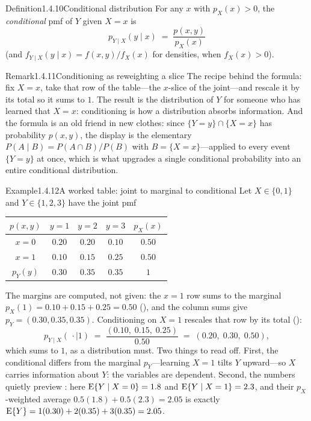 \documentclass[main.tex]{subfiles}
\begin{document}
\begin{Obj}{Definition}{1.4.10}{Conditional distribution}
For any $x$ with $p_X(x)>0$, the \emph{conditional} pmf of $Y$ given $X=x$ is
\[ p_{Y\mid X}(y\mid x) \;=\; \frac{p(x,y)}{p_X(x)} \]
(and $f_{Y\mid X}(y\mid x)=f(x,y)/f_X(x)$ for densities, when $f_X(x)>0$).
\end{Obj}

\begin{ObjL}{Remark}{1.4.11}{Conditioning as reweighting a slice}
The recipe behind the formula: fix $X=x$, take that row of the table---the $x$-slice of the
joint---and rescale it by its total so it sums to $1$. The result is the distribution of $Y$
for someone who has learned that $X=x$: conditioning is how a distribution absorbs
information. And the formula is an old friend in new clothes: since $\{Y=y\}\cap\{X=x\}$ has
probability $p(x,y)$, the display is the elementary $P(A\mid B)=P(A\cap B)/P(B)$ with
$B=\{X=x\}$---applied to every event $\{Y=y\}$ at once, which is what upgrades a single
conditional probability into an entire conditional distribution.
\end{ObjL}

\begin{ObjL}{Example}{1.4.12}{A worked table: joint to marginal to conditional}
Let $X\in\{0,1\}$ and $Y\in\{1,2,3\}$ have the joint pmf
\begin{center}
\begin{tabular}{@{}c|ccc|c@{}}
$p(x,y)$ & $y=1$ & $y=2$ & $y=3$ & $p_X(x)$\\ \hline
$x=0$ & $0.20$ & $0.20$ & $0.10$ & $0.50$\\
$x=1$ & $0.10$ & $0.15$ & $0.25$ & $0.50$\\ \hline
$p_Y(y)$ & $0.30$ & $0.35$ & $0.35$ & $1$\\
\end{tabular}
\end{center}
The margins are computed, not given: the $x=1$ row sums to the marginal
$p_X(1)=0.10+0.15+0.25=0.50$ (), and the column sums give
$p_Y=(0.30,0.35,0.35)$. Conditioning on $X=1$ rescales that row by its total ():
\[ p_{Y\mid X}(\,\cdot\mid 1) \;=\; \frac{(0.10,\;0.15,\;0.25)}{0.50}
   \;=\; (0.20,\;0.30,\;0.50), \]
which sums to $1$, as a distribution must. Two things to read off. First, the conditional
differs from the marginal $p_Y$---learning $X=1$ tilts $Y$ upward---so $X$ carries information
about $Y$: the variables are dependent. Second, the numbers quietly preview :
here $\mathrm{E}\{Y\mid X=0\}=1.8$ and $\mathrm{E}\{Y\mid X=1\}=2.3$, and their $p_X$-weighted average
$0.5(1.8)+0.5(2.3)=2.05$ is exactly $\mathrm{E}\{Y\}=1(0.30)+2(0.35)+3(0.35)=2.05$.
\end{ObjL}
\end{document}
